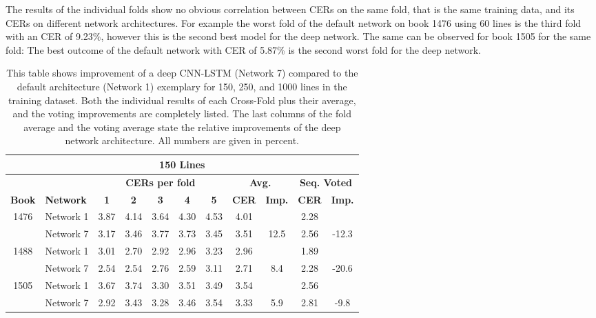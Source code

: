 \documentclass{jlcl}
\begin{document}
The results of the individual folds show no obvious correlation between CERs on the same fold, that is the same training data, and its CERs on different network architectures.
For example the worst fold of the default network on book 1476 using 60 lines is the third fold with an CER of 9.23\%, however this is the second best model for the deep network.
The same can be observed for book 1505 for the same fold: The best outcome of the default network with CER of 5.87\% is the second worst fold for the deep network.

\begin{table}[tp]
    \setlength{\tabcolsep}{0.5em}
    \centering
    \caption{This table shows improvement of a deep CNN-LSTM (Network 7) compared to the default architecture (Network 1) exemplary for 150, 250, and 1000 lines in the training dataset.
    Both the individual results of each Cross-Fold plus their average, and the voting improvements are completely listed.
    The last columns of the fold average and the voting average state the relative improvements of the deep network architecture.
    All numbers are given in percent.}
    \label{tab:results}
    \begin{tabular}{c|l|ccccc|cc|cc}
        \hline
        \multicolumn{11}{c}{\textbf{150 Lines}} \\
        \hline
        \hline
             &       &\multicolumn{5}{c|}{\textbf{CERs per fold}} & \multicolumn{2}{c}{\textbf{Avg.}} & \multicolumn{2}{c}{\textbf{Seq. Voted}} \\
        \hline
        \textbf{Book} & \textbf{Network} & \textbf{1} & \textbf{2} & \textbf{3} & \textbf{4} & \textbf{5} & \textbf{CER} & \textbf{Imp.} & \textbf{CER} & \textbf{Imp.} \\
        \hline
        1476 & Network 1 & 3.87 & 4.14 & 3.64 & 4.30 & 4.53 & 4.01 &      & 2.28 &       \\
             & Network 7 & 3.17 & 3.46 & 3.77 & 3.73 & 3.45 & 3.51 & 12.5 & 2.56 & -12.3 \\
        1488 & Network 1 & 3.01 & 2.70 & 2.92 & 2.96 & 3.23 & 2.96 &      & 1.89 &       \\
             & Network 7 & 2.54 & 2.54 & 2.76 & 2.59 & 3.11 & 2.71 &  8.4 & 2.28 & -20.6 \\
        1505 & Network 1 & 3.67 & 3.74 & 3.30 & 3.51 & 3.49 & 3.54 &      & 2.56 &       \\
             & Network 7 & 2.92 & 3.43 & 3.28 & 3.46 & 3.54 & 3.33 &  5.9 & 2.81 &  -9.8 \\

\end{tabular}
\end{table}
\end{document}
